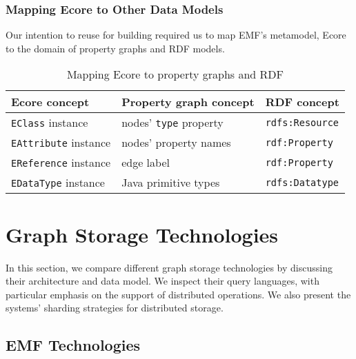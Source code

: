 \subsubsection{Mapping Ecore to Other Data Models}
\label{ecore-mapping}

Our intention to reuse \eiq{} for building \iqd{} required us to map EMF's metamodel, Ecore to the domain of property graphs and RDF models.

\begin{table}[htb]

\centering
\begin{tabular}{ | l | l | l | }

\hline
\bf Ecore concept          & \bf Property graph concept  & \bf RDF concept \tabularnewline \hline\hline
\verb+EClass+ instance     & nodes' \verb+type+ property & \verb+rdfs:Resource+ \\ \hline
\verb+EAttribute+ instance & nodes' property names       & \verb+rdf:Property+  \\ \hline
\verb+EReference+ instance & edge label                  & \verb+rdf:Property+  \\ \hline
\verb+EDataType+ instance  & Java primitive types        & \verb+rdfs:Datatype+ \\ \hline
 
\end{tabular}
\caption{Mapping Ecore to property graphs and RDF}
\label{tab:ecore-mapping}

\end{table}


\section{Graph Storage Technologies}
\label{graph-storage-technologies}

In this section, we compare different graph storage technologies by discussing their architecture and data model. We inspect their query languages, with particular emphasis on the support of distributed operations. We also present the systems' sharding strategies for distributed storage.


\subsection{EMF Technologies}
\label{emf}

